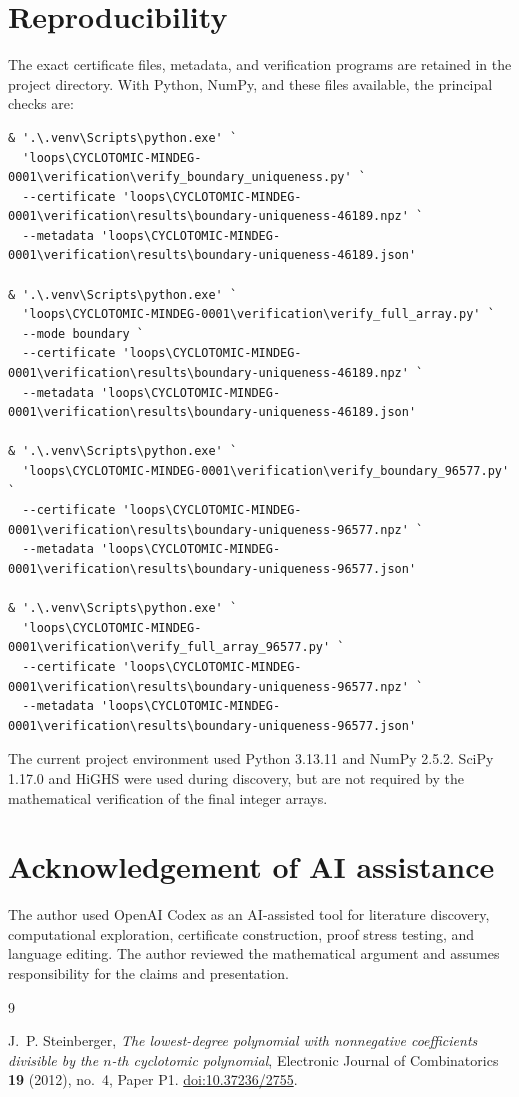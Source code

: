 \documentclass[11pt]{article}
\numberwithin{equation}{section}
\begin{document}
\section{Reproducibility}


The exact certificate files, metadata, and verification programs are retained
in the project {\small{}} directory. With Python, NumPy, and these files
available, the principal checks are:

\begin{Verbatim}[fontsize=\footnotesize]
& '.\.venv\Scripts\python.exe' `
  'loops\CYCLOTOMIC-MINDEG-0001\verification\verify_boundary_uniqueness.py' `
  --certificate 'loops\CYCLOTOMIC-MINDEG-0001\verification\results\boundary-uniqueness-46189.npz' `
  --metadata 'loops\CYCLOTOMIC-MINDEG-0001\verification\results\boundary-uniqueness-46189.json'

& '.\.venv\Scripts\python.exe' `
  'loops\CYCLOTOMIC-MINDEG-0001\verification\verify_full_array.py' `
  --mode boundary `
  --certificate 'loops\CYCLOTOMIC-MINDEG-0001\verification\results\boundary-uniqueness-46189.npz' `
  --metadata 'loops\CYCLOTOMIC-MINDEG-0001\verification\results\boundary-uniqueness-46189.json'

& '.\.venv\Scripts\python.exe' `
  'loops\CYCLOTOMIC-MINDEG-0001\verification\verify_boundary_96577.py' `
  --certificate 'loops\CYCLOTOMIC-MINDEG-0001\verification\results\boundary-uniqueness-96577.npz' `
  --metadata 'loops\CYCLOTOMIC-MINDEG-0001\verification\results\boundary-uniqueness-96577.json'

& '.\.venv\Scripts\python.exe' `
  'loops\CYCLOTOMIC-MINDEG-0001\verification\verify_full_array_96577.py' `
  --certificate 'loops\CYCLOTOMIC-MINDEG-0001\verification\results\boundary-uniqueness-96577.npz' `
  --metadata 'loops\CYCLOTOMIC-MINDEG-0001\verification\results\boundary-uniqueness-96577.json'
\end{Verbatim}


The current project environment used Python 3.13.11 and NumPy 2.5.2. SciPy
1.17.0 and HiGHS were used during discovery, but are not required by the
mathematical verification of the final integer arrays.

\section*{Acknowledgement of AI assistance}


The author used OpenAI Codex as an AI-assisted tool for literature discovery,
computational exploration, certificate construction, proof stress testing,
and language editing. The author reviewed the mathematical argument and
assumes responsibility for the claims and presentation.

\begin{thebibliography}{9}
\footnotesize
\raggedright

J.~P. Steinberger,
\emph{The lowest-degree polynomial with nonnegative coefficients divisible by
the $n$-th cyclotomic polynomial},
Electronic Journal of Combinatorics \textbf{19} (2012), no.~4, Paper P1.
\href{https://doi.org/10.37236/2755}{doi:10.37236/2755}.

\end{thebibliography}
\end{document}

